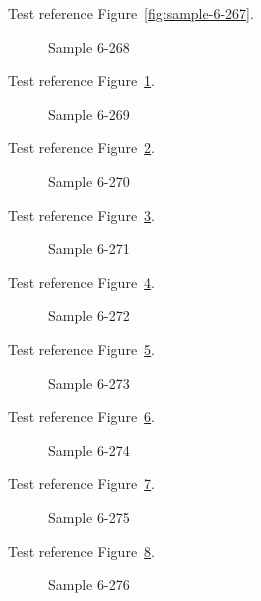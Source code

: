 Test reference Figure~\ref{fig:sample-6-267}.

\begin{figure}[tbhp]
\caption{Sample 6-268}
\label{fig:sample-6-268}
\end{figure}

Test reference Figure~\ref{fig:sample-6-268}.

\begin{figure}[tbhp]
\caption{Sample 6-269}
\label{fig:sample-6-269}
\end{figure}

Test reference Figure~\ref{fig:sample-6-269}.

\begin{figure}[tbhp]
\caption{Sample 6-270}
\label{fig:sample-6-270}
\end{figure}

Test reference Figure~\ref{fig:sample-6-270}.

\begin{figure}[tbhp]
\caption{Sample 6-271}
\label{fig:sample-6-271}
\end{figure}

Test reference Figure~\ref{fig:sample-6-271}.

\begin{figure}[tbhp]
\caption{Sample 6-272}
\label{fig:sample-6-272}
\end{figure}

Test reference Figure~\ref{fig:sample-6-272}.

\begin{figure}[tbhp]
\caption{Sample 6-273}
\label{fig:sample-6-273}
\end{figure}

Test reference Figure~\ref{fig:sample-6-273}.

\begin{figure}[tbhp]
\caption{Sample 6-274}
\label{fig:sample-6-274}
\end{figure}

Test reference Figure~\ref{fig:sample-6-274}.

\begin{figure}[tbhp]
\caption{Sample 6-275}
\label{fig:sample-6-275}
\end{figure}

Test reference Figure~\ref{fig:sample-6-275}.

\begin{figure}[tbhp]
\caption{Sample 6-276}
\label{fig:sample-6-276}
\end{figure}

